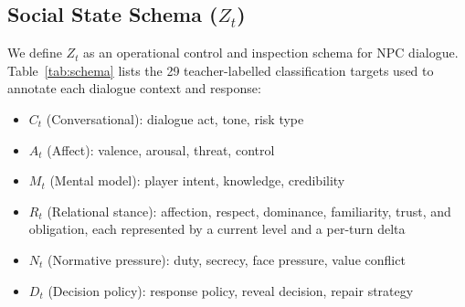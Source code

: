 \documentclass[11pt]{article}
\begin{document}



\subsection{Social State Schema ($Z_t$)}
\label{sec:schema}

We define $Z_t$ as an operational control and inspection schema for NPC dialogue. Table~\ref{tab:schema} lists the 29 teacher-labelled classification targets used to annotate each dialogue context and response:
\begin{itemize}
    \item \textbf{$C_t$} (Conversational): dialogue act, tone, risk type
    \item \textbf{$A_t$} (Affect): valence, arousal, threat, control
    \item \textbf{$M_t$} (Mental model): player intent, knowledge, credibility
    \item \textbf{$R_t$} (Relational stance): affection, respect, dominance, familiarity, trust, and obligation, each represented by a current level and a per-turn delta
    \item \textbf{$N_t$} (Normative pressure): duty, secrecy, face pressure, value conflict
    \item \textbf{$D_t$} (Decision policy): response policy, reveal decision, repair strategy
\end{itemize}
\end{document}
